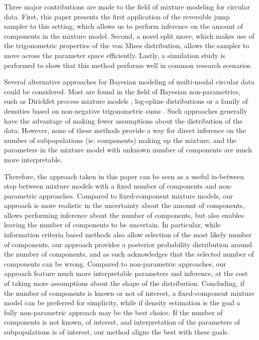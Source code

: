 Three major contributions are made to the field of mixture modeling for circular data. First, this paper presents the first application of the reversible jump sampler to this setting, which allows us to perform inference on the amount of components in the mixture model. Second, a novel split move, which makes use of the trigonometric properties of the von Mises distribution, allows the sampler to move across the parameter space efficiently. Lastly, a simulation study is performed to show that this method performs well in common research scenarios. 

Several alternative approaches for Bayesian modeling of multi-modal circular data could be considered. Most are found in the field of Bayesian non-parametrics, such as Dirichlet process mixture models \citep{Ghosh:2003ds},  log-spline distributions \citep{Ferreira:2008gv} or a family of densities based on non-negative trigonometric sums \citep{FernandezDuran:2016bm}. Such approaches generally have the advantage of making fewer assumptions about the distribution of the data. However, none of these methods provide a way for direct inference on the number of subpopulations (ie. components) making up the mixture, and the parameters in the mixture model with unknown number of components are much more interpretable. 

Therefore, the approach taken in this paper can be seen as a useful in-between step between mixture models with a fixed number of components and non-parametric approaches. Compared to fixed-component mixture models, our approach is more realistic in the uncertainty about the amount of components, allows performing inference about the number of components, but also enables leaving the number of components to be uncertain. In particular, while information criteria based methods also allow selection of the most likely number of components, our approach provides a posterior probability distribution around the number of components, and as such acknowledges that the selected number of components can be wrong. Compared to non-parametric approaches, our approach feature much more interpretable parameters and inference, at the cost of taking more assumptions about the shape of the distribution. Concluding, if the number of components is known or not of interest, a fixed-component mixture model can be preferred for simplicity, while if density estimation is the goal a fully non-parametric approach may be the best choice. If the number of components is not known, of interest, and interpretation of the parameters of subpopulations is of interest, our method aligns the best with these goals.


